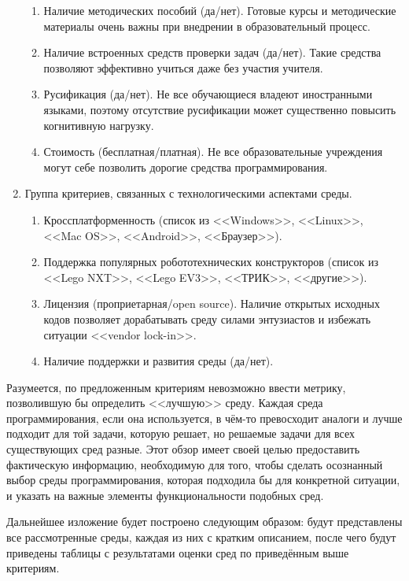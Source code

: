 \documentclass[a5paper]{article}
\begin{document}
\begin{enumerate}
\begin{enumerate}
        \item Наличие методических пособий (да/нет). Готовые курсы и методические материалы очень 
                важны при внедрении в образовательный процесс.
        \item Наличие встроенных средств проверки задач (да/нет). Такие средства позволяют эффективно 
                учиться даже без участия учителя.
        \item Русификация (да/нет). Не все обучающиеся владеют иностранными языками, поэтому отсутствие 
                русификации может существенно повысить когнитивную нагрузку.
        \item Стоимость (бесплатная/платная). Не все образовательные учреждения могут себе позволить дорогие 
                средства программирования.
    \end{enumerate}
    \item Группа критериев, связанных с технологическими аспектами среды.
    \begin{enumerate}
        \item Кроссплатформенность (список из <<Windows>>, <<Linux>>, <<Mac OS>>, <<Android>>, <<Браузер>>).
        \item Поддержка популярных робототехнических конструкторов (список из <<Lego NXT>>, <<Lego EV3>>, 
                <<ТРИК>>, <<другие>>).
        \item Лицензия (проприетарная/open source). Наличие открытых исходных кодов позволяет дорабатывать 
                среду силами энтузиастов и избежать ситуации <<vendor lock-in>>.
        \item Наличие поддержки и развития среды (да/нет).
    \end{enumerate}
\end{enumerate}

Разумеется, по предложенным критериям невозможно ввести метрику, позволившую бы определить <<лучшую>> среду. 
Каждая среда программирования, если она используется, в чём-то превосходит аналоги и лучше подходит для той 
задачи, которую решает, но решаемые задачи для всех существующих сред разные. Этот обзор имеет своей целью 
предоставить фактическую информацию, необходимую для того, чтобы сделать осознанный выбор среды 
программирования, которая подходила бы для конкретной ситуации, и указать на важные элементы функциональности 
подобных сред.

Дальнейшее изложение будет построено следующим образом: будут представлены все рассмотренные среды, 
каждая из них с кратким описанием, после чего будут приведены таблицы с результатами оценки сред 
по приведённым выше критериям.
\end{document}
